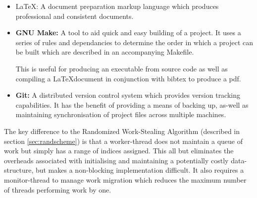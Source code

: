 \begin{itemize}
\item         \LaTeX:    A document preparation markup language which produces professional and consistent 
                         documents. 

\item \textbf{GNU Make:} A tool to aid quick and easy building of a project. It uses a series of 
                         rules and dependancies to determine the order in which a project can be built 
                         which are described in an accompanying Makefile. 
                         
                         This is useful for  producing an executable from source code as well
                         as compiling a \LaTeX  document in conjunction with bibtex to produce a pdf.

\item \textbf{Git:}      A distributed version control system which provides version tracking capabilities. 
                         It has the benefit of providing a means of backing up, as-well as maintaining 
                         synchronisation of project files across multiple machines.
\end{itemize}

The key difference to the Randomized Work-Stealing Algorithm (described in section \ref{sec:randscheme}) is that a \gls{worker-thread} 
does not maintain a queue of work but simply has a range of indices assigned. This all but eliminates the overheads associated with initialising and 
maintaining a potentially costly data-structure, but makes a \gls{non-blocking} implementation difficult. It also requires a monitor-thread to manage
work migration which reduces the maximum number of threads performing work by one.


